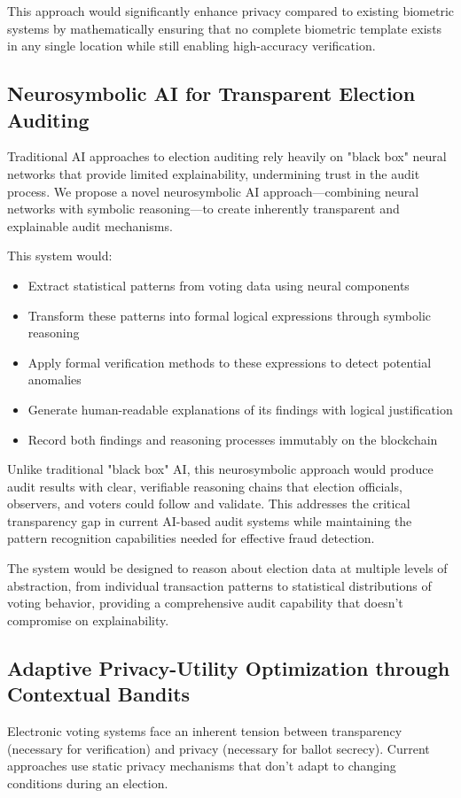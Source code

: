 \documentclass[conference]{IEEEtran}
\begin{document}
This approach would significantly enhance privacy compared to existing biometric systems by mathematically ensuring that no complete biometric template exists in any single location while still enabling high-accuracy verification.

\subsection{Neurosymbolic AI for Transparent Election Auditing}
Traditional AI approaches to election auditing rely heavily on "black box" neural networks that provide limited explainability, undermining trust in the audit process. We propose a novel neurosymbolic AI approach—combining neural networks with symbolic reasoning—to create inherently transparent and explainable audit mechanisms.

This system would:

\begin{itemize}
    \item Extract statistical patterns from voting data using neural components
    \item Transform these patterns into formal logical expressions through symbolic reasoning
    \item Apply formal verification methods to these expressions to detect potential anomalies
    \item Generate human-readable explanations of its findings with logical justification
    \item Record both findings and reasoning processes immutably on the blockchain
\end{itemize}

Unlike traditional "black box" AI, this neurosymbolic approach would produce audit results with clear, verifiable reasoning chains that election officials, observers, and voters could follow and validate. This addresses the critical transparency gap in current AI-based audit systems while maintaining the pattern recognition capabilities needed for effective fraud detection.

The system would be designed to reason about election data at multiple levels of abstraction, from individual transaction patterns to statistical distributions of voting behavior, providing a comprehensive audit capability that doesn't compromise on explainability.

\subsection{Adaptive Privacy-Utility Optimization through Contextual Bandits}
Electronic voting systems face an inherent tension between transparency (necessary for verification) and privacy (necessary for ballot secrecy). Current approaches use static privacy mechanisms that don't adapt to changing conditions during an election.
\end{document}
